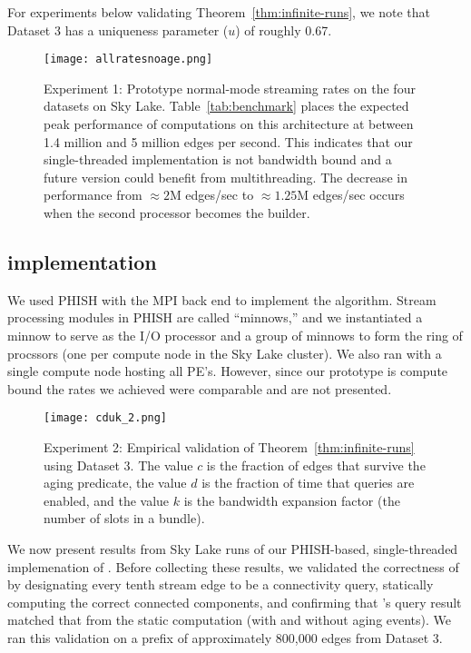 For experiments below validating Theorem~\ref{thm:infinite-runs}, 
we note that Dataset 3 has a uniqueness parameter ($u$) of roughly 0.67.

\begin{figure}[htb]
\begin{center}
\texttt{[image: allratesnoage.png]}
\end{center}
\caption{Experiment 1: Prototype \XSCC normal-mode
streaming rates on the four datasets\label{fig:experiment1} on Sky Lake.
Table~\ref{tab:benchmark} places the expected peak performance of \XStream
computations on this architecture at between 1.4 million and 5 million edges
per second.  This indicates that our single-threaded \XSCC implementation is
not bandwidth bound and a future version could benefit from multithreading.
The decrease in performance from $\approx 2$M edges/sec to $\approx 1.25$M
edges/sec occurs when the second \XStream processor becomes the builder.}
\end{figure}

\subsection{\XSCC implementation}
We used PHISH with the MPI back end to implement the \XSCC algorithm.  Stream
processing modules in PHISH are called ``minnows,'' and we instantiated a 
minnow to serve as the \XStream I/O processor and a group of minnows to form
the \XStream ring of procssors (one per compute node in the Sky Lake cluster).
We also ran with a single compute node hosting all \XSCC PE's.  However,
since our prototype is compute bound the rates we achieved were comparable
and are not presented.

\begin{figure}[htb]
\begin{center}
\texttt{[image: cduk\_2.png]}
\end{center}
\caption{Experiment 2: Empirical validation of Theorem~\ref{thm:infinite-runs}
using Dataset 3.  \label{fig:experiment2}  The value $c$ is the fraction of
edges that survive the aging predicate, the value $d$ is the fraction of 
time that queries are enabled, and the value $k$ is the bandwidth expansion
factor (the number of slots in a bundle).}
\end{figure}

We now present results from Sky Lake runs of our PHISH-based, single-threaded
implemenation of \XSCCns.  Before collecting these results, we
validated the correctness of \XSCC by designating every tenth stream
edge to be a connectivity query, statically computing the correct connected
components, and confirming that \XSCCns's query result matched that from
the static computation (with and without aging events).  We ran this
validation on a prefix of approximately 800,000 edges from
Dataset 3.

